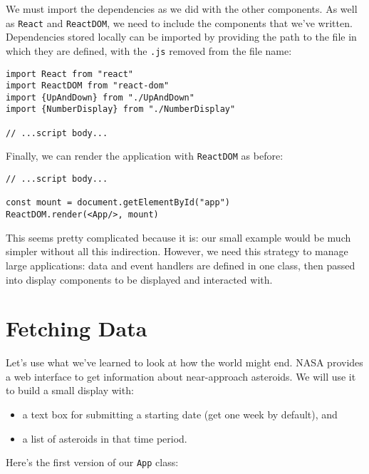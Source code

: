 
We must import the dependencies as we did with the other components.
As well as \texttt{React} and \texttt{ReactDOM},
we need to include the components that we've written.
Dependencies stored locally can be imported by providing the path to
the file in which they are defined,
with the \texttt{.js} removed from the file name:

\begin{verbatim}
import React from "react"
import ReactDOM from "react-dom"
import {UpAndDown} from "./UpAndDown"
import {NumberDisplay} from "./NumberDisplay"

// ...script body...
\end{verbatim}

Finally,
we can render the application with \texttt{ReactDOM} as before:

\begin{verbatim}
// ...script body...

const mount = document.getElementById("app")
ReactDOM.render(<App/>, mount)
\end{verbatim}

This seems pretty complicated because it is:
our small example would be much simpler without all this indirection.
However,
we need this strategy to manage large applications:
data and event handlers are defined in one class,
then passed into display components to be displayed and interacted with.

\section{Fetching Data}\label{s:interactive-fetching}

Let's use what we've learned to look at how the world might end.
NASA provides a web interface to get information about near-approach asteroids.
We will use it to build a small display with:

\begin{itemize}
\item
  a text box for submitting a starting date (get one week by default), and
\item
  a list of asteroids in that time period.
\end{itemize}

Here's the first version of our \texttt{App} class:

